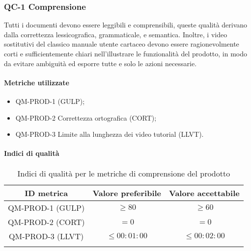 \subsubsection{QC-1 Comprensione}
Tutti i documenti devono essere leggibili e comprensibili, queste qualità derivano dalla correttezza lessicografica, grammaticale, e semantica.
\newline
Inoltre, i video sostitutivi del classico manuale utente cartaceo devono essere ragionevolmente corti e sufficientemente chiari nell'illustrare le funzionalità del prodotto, in modo da evitare ambiguità ed esporre tutte e solo le azioni necessarie.
	
	\paragraph{Metriche utilizzate}
	\begin{itemize}
		\item QM-PROD-1  (GULP);
    	\item QM-PROD-2 Correttezza ortografica (CORT);
    	\item QM-PROD-3 Limite alla lunghezza dei video tutorial (LLVT).
	\end{itemize}

	\paragraph{Indici di qualità}
	\begin{center}
		\begin{longtable}{|c|c|c|}
			\hline
			\rowcolor{lighter-grayer}
			\textbf{ID metrica} & \textbf{Valore preferibile} & \textbf{Valore accettabile} \\
			\hline 
			\endhead
			QM-PROD-1 (GULP) & \(\ge 80\) & \(\ge 60\) \\
 		  	\hline
			QM-PROD-2 (CORT) & \(= 0\) & \(= 0\) \\
			\hline
			QM-PROD-3 (LLVT) & \(\le 00:01:00\)  & \(\le 00:02:00\) \\
			\hline
			\caption{Indici di qualità per le metriche di comprensione del prodotto}
		\end{longtable}
	\end{center}
